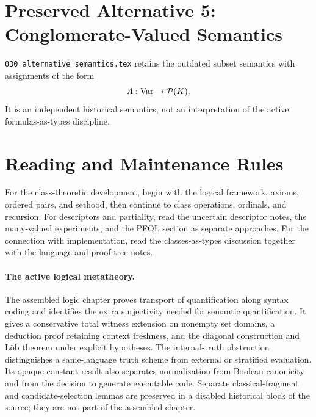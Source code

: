 \section{Preserved Alternative 5: Conglomerate-Valued Semantics}

\texttt{030\_\allowbreak alternative\_\allowbreak semantics.tex} retains the outdated subset semantics
with assignments of the form
\[
A:\mathrm{Var}\to\mathcal{P}(K).
\]
It is an independent historical semantics, not an interpretation of the
active formulas-as-types discipline.

\section{Reading and Maintenance Rules}

For the class-theoretic development, begin with the logical framework,
axioms, ordered pairs, and sethood, then continue to class operations,
ordinals, and recursion. For descriptors and partiality, read the uncertain
descriptor notes, the many-valued experiments, and the PFOL section as
separate approaches. For the connection with implementation, read the
classes-as-types discussion together with the language and proof-tree notes.

\paragraph{The active logical metatheory.}
The assembled logic chapter proves transport of quantification along
syntax coding and identifies the extra surjectivity needed for semantic
quantification. It gives a conservative total witness extension on
nonempty set domains, a deduction proof retaining context freshness,
and the diagonal construction and L\"ob theorem under explicit hypotheses.
The internal-truth obstruction distinguishes a same-language truth scheme
from external or stratified evaluation. Its opaque-constant result also
separates normalization from Boolean canonicity and from the decision
to generate executable code. Separate classical-fragment and
candidate-selection lemmas are preserved in a disabled historical block
of the source; they are not part of the assembled chapter.

